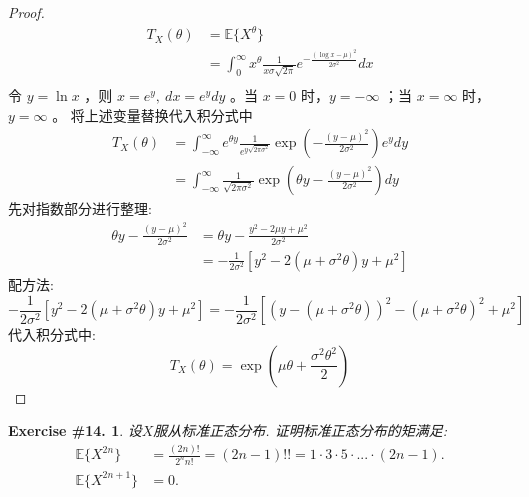 \documentclass[UTF8, a4paper]{article}
\newtheorem{exercise}{Exercise \#14.}
\begin{document}
\begin{proof}
$$
\begin{aligned}
    T_X(\theta) &= \mathbb{E}\{X^{\theta}\} \\
    &= \int_{0}^{\infty} x^{\theta } \frac{1}{x\sigma\sqrt{2\pi}} e^{-\frac{(\log x - \mu)^2}{2\sigma^2}} dx \\
\end{aligned}
$$
令 $y=\ln x$ ，则 $x=e^y, ~ d x=e^y d y$ 。当 $x=0$ 时，$y=-\infty$ ；当 $x=\infty$ 时，$y=\infty$ 。
将上述变量替换代入积分式中
$$
\begin{aligned}
T_X(\theta) & =\int_{-\infty}^{\infty} e^{\theta y} \frac{1}{e^{y \sqrt{2 \pi \sigma^2}}} \exp \left(-\frac{(y-\mu)^2}{2 \sigma^2}\right) e^y d y \\
& =\int_{-\infty}^{\infty} \frac{1}{\sqrt{2 \pi \sigma^2}} \exp \left(\theta y-\frac{(y-\mu)^2}{2 \sigma^2}\right) d y
\end{aligned}
$$
先对指数部分进行整理:
$$
\begin{aligned}
\theta y-\frac{(y-\mu)^2}{2 \sigma^2} & =\theta y-\frac{y^2-2 \mu y+\mu^2}{2 \sigma^2} \\
& =-\frac{1}{2 \sigma^2}\left[y^2-2\left(\mu+\sigma^2 \theta\right) y+\mu^2\right]
\end{aligned}
$$
配方法:
$$
-\frac{1}{2 \sigma^2}\left[y^2-2\left(\mu+\sigma^2 \theta\right) y+\mu^2\right]=-\frac{1}{2 \sigma^2}\left[\left(y-\left(\mu+\sigma^2 \theta\right)\right)^2-\left(\mu+\sigma^2 \theta\right)^2+\mu^2\right]
$$
代入积分式中:
$$
T_X(\theta)=\exp \left(\mu \theta+\frac{\sigma^2 \theta^2}{2}\right)
$$
\end{proof}



\begin{framed}
\begin{exercise}
设\(X\)服从标准正态分布. 证明标准正态分布的矩满足:
$$\begin{aligned}
    \mathbb{E}\{X^{2n}\} &= \frac{(2n)!}{2^n n!} = (2n - 1)!! = 1 \cdot 3 \cdot 5 \cdot ... \cdot (2n-1). \\
    \mathbb{E}\{X^{2n+1}\} &= 0.
\end{aligned} $$
\end{exercise}
\end{framed}
\end{document}
